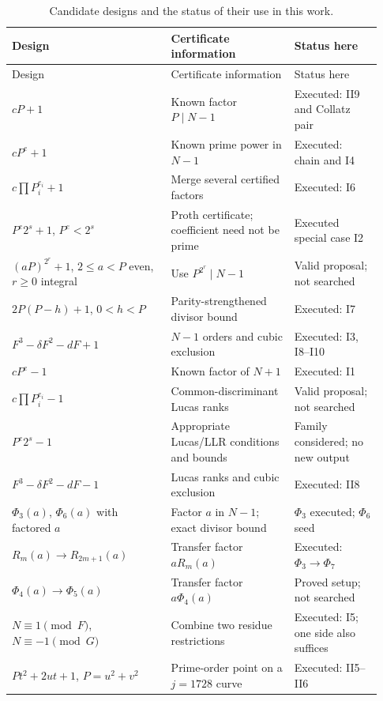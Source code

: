 \documentclass[11pt,a4paper]{article}
\theoremstyle{definition}\newtheorem{definition}[theorem]{Definition}
\theoremstyle{remark}\newtheorem{remark}[theorem]{Remark}
\begin{document}
{\small
\begin{longtable}{@{}>{\raggedright\arraybackslash}p{0.40\linewidth}>{\raggedright\arraybackslash}p{0.31\linewidth}>{\raggedright\arraybackslash}p{0.22\linewidth}@{}}
\caption{Candidate designs and the status of their use in this work.}
\label{tab:catalogue}\\
\toprule
Design & Certificate information & Status here\\
\midrule\endfirsthead
\toprule Design & Certificate information & Status here\\\midrule\endhead
\bottomrule\endfoot
$cP+1$ & Known factor $P\mid N-1$ & Executed: II9 and Collatz pair\\
$cP^e+1$ & Known prime power in $N-1$ & Executed: chain and I4\\
$c\prod P_i^{e_i}+1$ & Merge several certified factors & Executed: I6\\
$P^e2^s+1$, $P^e<2^s$ & Proth certificate; coefficient need not be prime & Executed special case I2\\
$(aP)^{2^r}+1$, $2\le a<P$ even, $r\ge0$ integral & Use $P^{2^r}\mid N-1$ & Valid proposal; not searched\\
$2P(P-h)+1$, $0<h<P$ & Parity-strengthened divisor bound & Executed: I7\\
$F^3-\delta F^2-dF+1$ & $N-1$ orders and cubic exclusion & Executed: I3, I8--I10\\
$cP^e-1$ & Known factor of $N+1$ & Executed: I1\\
$c\prod P_i^{e_i}-1$ & Common-discriminant Lucas ranks & Valid proposal; not searched\\
$P^e2^s-1$ & Appropriate Lucas/LLR conditions and bounds & Family considered; no new output\\
$F^3-\delta F^2-dF-1$ & Lucas ranks and cubic exclusion & Executed: II8\\
$\Phi_3(a)$, $\Phi_6(a)$ with factored $a$ & Factor $a$ in $N-1$; exact divisor bound & $\Phi_3$ executed; $\Phi_6$ seed\\
$R_m(a)\to R_{2m+1}(a)$ & Transfer factor $aR_m(a)$ & Executed: $\Phi_3\to\Phi_7$\\
$\Phi_4(a)\to\Phi_5(a)$ & Transfer factor $a\Phi_4(a)$ & Proved setup; not searched\\
$N\equiv1\pmod F$, $N\equiv-1\pmod G$ & Combine two residue restrictions & Executed: I5; one side also suffices\\
$Pt^2+2ut+1$, $P=u^2+v^2$ & Prime-order point on a $j=1728$ curve & Executed: II5--II6\\

\end{longtable}}
\end{document}
